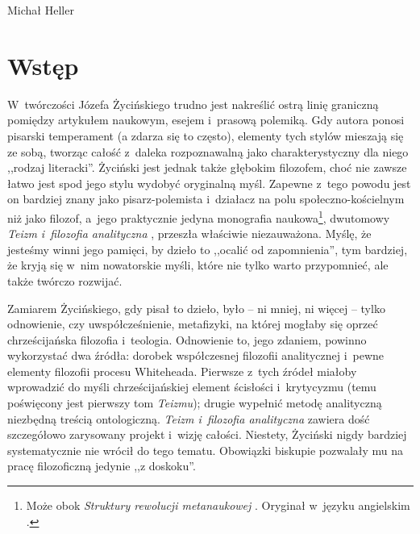 \begin{artplenv}{Michał Heller}
\section{Wstęp}
\lettrine[loversize=0.13,lines=2,lraise=-0.01,nindent=0em,findent=0.2pt]%
{W}{}~twórczości Józefa Życińskiego trudno jest nakreślić ostrą linię graniczną pomiędzy artykułem naukowym, esejem i~prasową polemiką. Gdy autora ponosi pisarski temperament (a zdarza się to często), elementy tych stylów mieszają się ze sobą, tworząc całość z~daleka rozpoznawalną jako charakterystyczny dla niego ,,rodzaj literacki''. Życiński jest jednak także głębokim filozofem, choć nie zawsze łatwo jest spod jego stylu wydobyć oryginalną myśl. Zapewne z~tego powodu jest on bardziej znany jako pisarz-polemista i~działacz na polu społeczno-kościelnym niż jako filozof, a~jego praktycznie jedyna monografia naukowa\footnote{ Może obok \textit{Struktury rewolucji metanaukowej}
\parencite[][]{zycinski_struktura_2013}. %
 Oryginał w~języku angielskim 
\parencite[][]{zycinski_structure_1988}.%
}, dwutomowy \textit{Teizm i~filozofia analityczna} 
\parencites{zycinski_teizm_1985}[][]{zycinski_teizm_1988}, %
 przeszła właściwie niezauważona. Myślę, że jesteśmy winni jego pamięci, by dzieło to ,,ocalić od zapomnienia'', tym bardziej, że kryją się w~nim nowatorskie myśli, które nie tylko warto przypomnieć, ale także twórczo rozwijać.

Zamiarem Życińskiego, gdy pisał to dzieło, było -- ni mniej, ni więcej -- tylko odnowienie, czy uwspółcześnienie, metafizyki, na której mogłaby się oprzeć chrześcijańska filozofia i~teologia. Odnowienie to, jego zdaniem, powinno wykorzystać dwa źródła: dorobek współczesnej filozofii analitycznej i~pewne elementy filozofii procesu Whiteheada. Pierwsze z~tych źródeł miałoby wprowadzić do myśli chrześcijańskiej element ścisłości i~krytycyzmu (temu poświęcony jest pierwszy tom \textit{Teizmu}); drugie wypełnić metodę analityczną niezbędną treścią ontologiczną. \textit{Teizm i~filozofia analityczna} zawiera dość szczegółowo zarysowany projekt i~wizję całości. Niestety, Życiński nigdy bardziej systematycznie nie wrócił do tego tematu. Obowiązki biskupie pozwalały mu na pracę filozoficzną jedynie ,,z doskoku''.


\end{artplenv}
